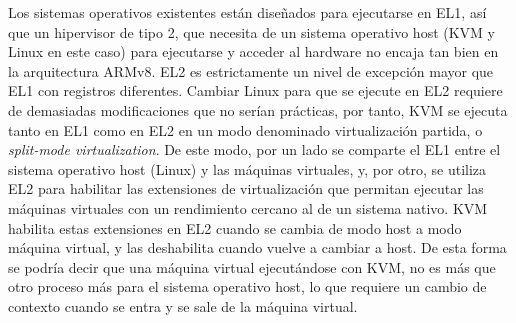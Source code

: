 Los sistemas operativos existentes están diseñados para ejecutarse en EL1, así que un hipervisor de tipo 2, que necesita de un sistema operativo host (KVM y Linux en este caso) para ejecutarse y acceder al hardware
no encaja tan bien en la arquitectura ARMv8. EL2 es estrictamente un nivel de excepción mayor que EL1 con registros diferentes. Cambiar Linux para que se ejecute en EL2 requiere de demasiadas modificaciones que no serían prácticas, por tanto, KVM se ejecuta tanto en EL1 como en EL2 en un modo denominado virtualización partida, o \textit{split-mode virtualization}. De este modo, por un lado se comparte el EL1 entre el sistema operativo host (Linux) y las máquinas virtuales, y, por otro, se utiliza EL2 para habilitar las extensiones de virtualización que permitan ejecutar las máquinas virtuales con un rendimiento cercano al de un sistema nativo. KVM habilita estas extensiones en EL2 cuando se cambia de modo host a modo máquina virtual, y las deshabilita cuando vuelve a cambiar a host. De esta forma se podría decir que una máquina virtual ejecutándose con KVM, no es más que otro proceso más para el sistema operativo host, lo que requiere un cambio de contexto cuando se entra y se sale de la máquina virtual.\\



